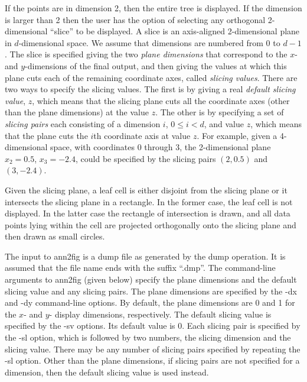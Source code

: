 \documentclass[11pt]{article}		%
\newcommand{\annfig}[0]{\textsf{ann2fig}}
\begin{document}
If the points are in dimension 2, then the entire tree is displayed.  If
the dimension is larger than 2 then the user has the option of selecting
any orthogonal 2-dimensional ``slice'' to be displayed.  A slice is an
axis-aligned 2-dimensional plane in $d$-dimensional space.  We assume
that dimensions are numbered from 0 to $d-1$.  The slice is specified
giving the two \emph{plane dimensions} that correspond to the $x$- and
$y$-dimensions of the final output, and then giving the values at which
this plane cuts each of the remaining coordinate axes, called
\emph{slicing values}.  There are two ways to specify the slicing
values.  The first is by giving a real \emph{default slicing value},
$z$, which means that the slicing plane cuts all the coordinate axes
(other than the plane dimensions) at the value $z$.  The other is by
specifying a set of \emph{slicing pairs} each consisting of a dimension
$i$, $0 \le i < d$, and value $z$, which means that the plane cuts the
$i$th coordinate axis at value $z$.  For example, given a 4-dimensional
space, with coordinates 0 through 3, the 2-dimensional plane $x_2 =
0.5$, $x_3 = -2.4$, could be specified by the slicing pairs $(2,0.5)$
and $(3,-2.4)$.

Given the slicing plane, a leaf cell is either disjoint from the slicing
plane or it intersects the slicing plane in a rectangle.  In the former
case, the leaf cell is not displayed.  In the latter case the rectangle
of intersection is drawn, and all data points lying within the cell are
projected orthogonally onto the slicing plane and then drawn as small
circles.

The input to {\annfig} is a dump file as generated by the \textsf{dump}
operation.  It is assumed that the file name ends with the suffix
``.dmp''.  The command-line arguments to {\annfig} (given below) specify
the plane dimensions and the default slicing value and any slicing pairs.
The plane dimensions are specified by the \textsf{-dx} and \textsf{-dy} 
command-line options.  By default, the plane dimensions are 0 and 1 for
the $x$- and $y$- display dimensions, respectively.  The default slicing
value is specified by the \textsf{-sv} options.  Its default value is 0.  Each
slicing pair is specified by the \textsf{-sl} option, which is followed by
two numbers, the slicing dimension and the slicing value.  There may
be any number of slicing pairs specified by repeating the \textsf{-sl}
option.  Other than the plane dimensions, if slicing pairs are not
specified for a dimension, then the default slicing value is used instead.
\end{document}
